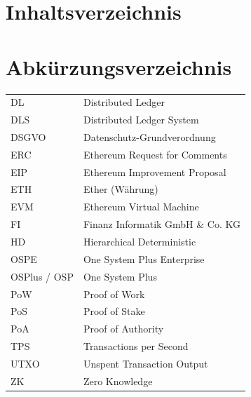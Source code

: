 \documentclass[12pt, a4paper]{article}
\begin{document}
    {   
        \setcounter{page}{1}
        \renewcommand{\thesection}{\Roman{section}}

    \section{Inhaltsverzeichnis}        

    \renewcommand{\contentsname}{}

    \setlength\cftbeforesecskip{3pt}
    \renewcommand{\cftsecleader}{\cftdotfill{\cftdotsep}}

    \tableofcontents 

    \newpage


    

\section{Abkürzungsverzeichnis}

\begin{longtable}{p{6 cm}p{9 cm}}
    DL & Distributed Ledger \\
    DLS & Distributed Ledger System \\
    DSGVO & Datenschutz-Grundverordnung \\
    ERC & Ethereum Request for Comments \\
    EIP & Ethereum Improvement Proposal \\
    ETH & Ether (Währung) \\
    EVM & Ethereum Virtual Machine \\
    FI & Finanz Informatik GmbH \& Co. KG \\
    HD & Hierarchical Deterministic \\
    OSPE & One System Plus Enterprise \\
    OSPlus / OSP & One System Plus \\
    PoW & Proof of Work \\
    PoS & Proof of Stake \\
    PoA & Proof of Authority \\
    TPS & Transactions per Second \\
    UTXO & Unspent Transaction Output \\
    ZK & Zero Knowledge \\
\end{longtable}

}
\end{document}
